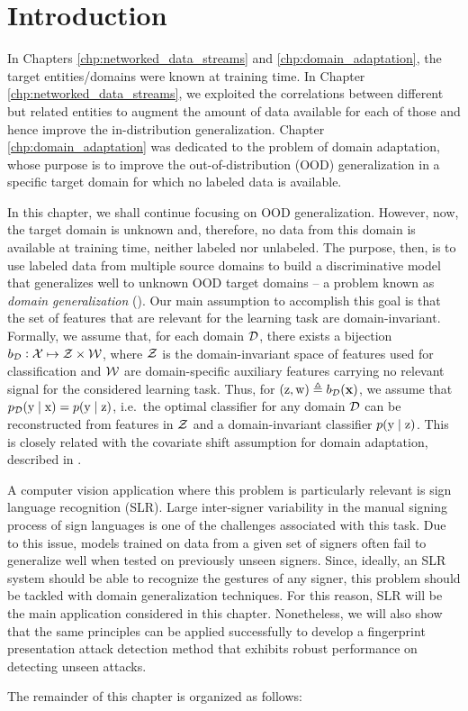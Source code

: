 \section{Introduction}
\label{sec:chp4_intro}
In Chapters \ref{chp:networked_data_streams} and \ref{chp:domain_adaptation}, the target entities/domains were known at training time. In Chapter \ref{chp:networked_data_streams}, we exploited the correlations between different but related entities to augment the amount of data available for each of those and hence improve the in-distribution generalization. Chapter \ref{chp:domain_adaptation} was dedicated to the problem of domain adaptation, whose purpose is to improve the out-of-distribution (OOD) generalization in a specific target domain for which no labeled data is available. 

In this chapter, we shall continue focusing on OOD generalization. However, now, the target domain is unknown and, therefore, no data from this domain is available at training time, neither labeled nor unlabeled. The purpose, then, is to use labeled data from multiple source domains to build a discriminative model that generalizes well to unknown OOD target domains -- a problem known as \emph{domain generalization} (\citet{Blanchard2011, Muandet2013}). Our main assumption to accomplish this goal is that the set of features that are relevant for the learning task are domain-invariant. Formally, we assume that, for each domain ${\mathcal{D}}$, there exists a bijection $b_{\mathcal{D}}: {\mathcal{X}} \mapsto {\mathcal{Z}} \times {\mathcal{W}}$, where ${\mathcal{Z}}$ is the domain-invariant space of features used for classification and ${\mathcal{W}}$ are domain-specific auxiliary features carrying no relevant signal for the considered learning task. Thus, for $({\textnormal{z}}, {\textnormal{w}}) \triangleq b_{\mathcal{D}}({\mathbf{x}})$, we assume that $p_{\mathcal{D}}({\textnormal{y}} \mid {\textnormal{x}}) = p({\textnormal{y}} \mid {\textnormal{z}})$, i.e.\ the optimal classifier for any domain ${\mathcal{D}}$ can be reconstructed from features in ${\mathcal{Z}}$ and a domain-invariant classifier $p({\textnormal{y}} \mid {\textnormal{z}})$.  This is closely related with the covariate shift assumption for domain adaptation, described in .

A computer vision application where this problem is particularly relevant is sign language recognition (SLR). Large inter-signer variability in the manual signing process of sign languages is one of the challenges associated with this task. Due to this issue, models trained on data from a given set of signers often fail to generalize well when tested on previously unseen signers. Since, ideally, an SLR system should be able to recognize the gestures of any signer, this problem should be tackled with domain generalization techniques. For this reason, SLR will be the main application considered in this chapter. Nonetheless, we will also show that the same principles can be applied successfully to develop a fingerprint presentation attack detection method that exhibits robust performance on detecting unseen attacks.

The remainder of this chapter is organized as follows: 


